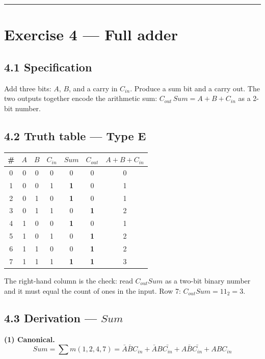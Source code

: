 \documentclass[11pt]{article}
\newcommand{\hr}{\vspace{2pt}\hrule\vspace{6pt}}
\begin{document}
\vspace{4pt}\hr

\section*{Exercise 4 --- Full adder}

\subsection*{4.1 Specification}

Add three bits: $A$, $B$, and a carry in $C_{in}$. Produce a sum bit and a carry out.
The two outputs together encode the arithmetic sum: $C_{out}\,Sum = A + B + C_{in}$
as a 2-bit number.

\subsection*{4.2 Truth table --- Type E}

\begin{center}
\begin{tabular}{c|ccc|cc|c}
\toprule
\# & $A$ & $B$ & $C_{in}$ & $Sum$ & $C_{out}$ & $A{+}B{+}C_{in}$ \\
\midrule
0 & 0 & 0 & 0 & 0 & 0 & 0 \\
1 & 0 & 0 & 1 & \textbf{1} & 0 & 1 \\
2 & 0 & 1 & 0 & \textbf{1} & 0 & 1 \\
3 & 0 & 1 & 1 & 0 & \textbf{1} & 2 \\
4 & 1 & 0 & 0 & \textbf{1} & 0 & 1 \\
5 & 1 & 0 & 1 & 0 & \textbf{1} & 2 \\
6 & 1 & 1 & 0 & 0 & \textbf{1} & 2 \\
7 & 1 & 1 & 1 & \textbf{1} & \textbf{1} & 3 \\
\bottomrule
\end{tabular}
\end{center}

The right-hand column is the check: read $C_{out}Sum$ as a two-bit binary number and
it must equal the count of ones in the input. Row 7: $C_{out}Sum = 11_2 = 3$. \checkmark

\subsection*{4.3 Derivation --- $Sum$}

\textbf{(1) Canonical.}
\[
Sum = \sum m(1,2,4,7) = \bar{A}\bar{B}C_{in} + \bar{A}B\bar{C_{in}} + A\bar{B}\bar{C_{in}} + ABC_{in}
\]
\end{document}
